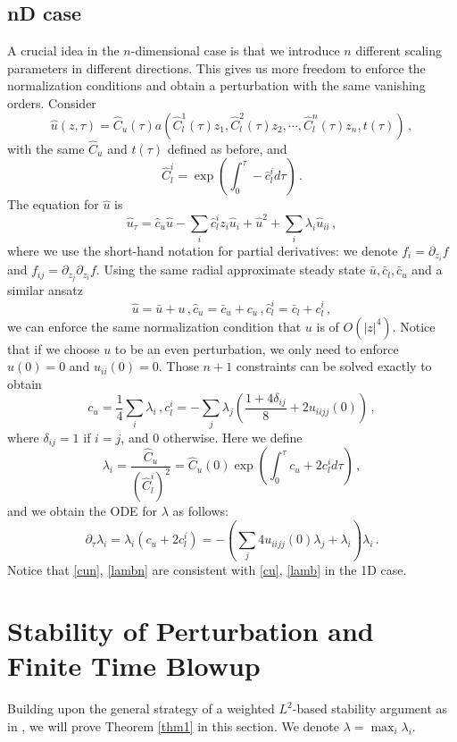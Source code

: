 \documentclass[12pt]{caltech_thesis}
\numberwithin{equation}{section}
\begin{document}
\subsection{nD case}\label{highd}
A crucial idea in the $n$-dimensional case is that we introduce $n$ different scaling parameters in different directions. This gives us more freedom to enforce the normalization conditions and obtain a perturbation with the same vanishing orders. Consider
$$\hat{u}(z,\tau)=\hat{C}_u(\tau) a(\hat{C}_l^1(\tau)z_1,\hat{C}_l^2(\tau)z_2,\cdots,\hat{C}_l^n(\tau)z_n,t(\tau))\,,$$ with the same $\hat{C}_u$ and $t(\tau)$ defined as before, and \begin{equation}
    \label{cl}\hat{C}_l^i=\exp{(\int_0^\tau -\hat{c}_l^i d\tau)}\,.
\end{equation}  The equation for $\hat{u}$ is \begin{equation}\label{drf}\hat{u}_\tau=\hat{c}_u \hat{u}-\sum_i\hat{c}_l^iz_i \hat{u}_{i}+\hat{u}^2+\sum_i\lambda_i\hat{u}_{ii}\,,\end{equation}
where we use the short-hand notation for partial derivatives: we denote $f_{i}=\partial_{z_i}f$ and $f_{ij}=\partial_{z_j}\partial_{z_i}f$.
Using the same radial approximate steady state $\bar{u},\bar{c}_l,\bar{c}_u$ and a similar ansatz
\begin{equation}
\label{ansatz}\hat{u}=\bar{u}+u\,, \hat{c}_u=\bar{c}_u+c_u\,, \hat{c}_l^i=\bar{c}_l+c_l^i\,,
\end{equation}
we can enforce the same normalization condition that $u$ is of $O(|z|^4)$. Notice that if we choose  $u$ to be an even perturbation, we only need to enforce $u(0)=0$ and ${u}_{ii}(0)=0$. Those $n+1$ constraints can be solved exactly to obtain \begin{equation}
\label{cun}
    {c_u}=\frac{1}{4}\sum_i\lambda_i\,,{c_l^i}=-\sum_j\lambda_j(\frac{ 1+4\delta_{ij}}{8}+2{u}_{iijj}(0))\,,
\end{equation}
where $\delta_{ij}=1$ if $i=j$, and $0$ otherwise. Here we define $$\lambda_i=\frac{\hat{C}_u}{(\hat{C}^i_l)^2}=\hat{C}_u(0)\exp{(\int_0^\tau {c_u}+2c^i_l d\tau)}\,,$$
and we obtain  the ODE for $\lambda$ as follows:\begin{equation}
\label{lambn}\partial_\tau\lambda_i=\lambda_i(c_u+2c^i_l)=-(\sum_j4{u}_{iijj}(0)\lambda_j+\lambda_i)\lambda_i\,.
\end{equation}
Notice that  \eqref{cun}, \eqref{lambn} are consistent with  \eqref{cu}, \eqref{lamb} in the 1D case.
 \section{Stability of Perturbation and Finite Time Blowup}
 Building upon the general strategy of a weighted $L^2$-based stability argument as in \cite{chen2021finite, chen2019finite2}, we will prove Theorem \ref{thm1} in this section. We denote $\lambda=\max_i{\lambda_i}$.
 
\end{document}
